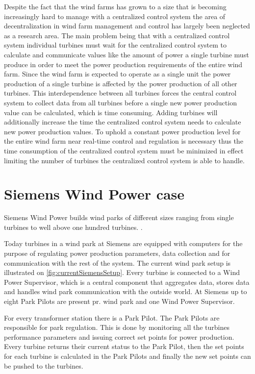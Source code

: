 Despite the fact that the wind farms has grown to a size that is becoming increasingly hard to manage with a centralized control system the area of decentralization in wind farm management and control has largely been neglected as a research area. The main problem being that with a centralized control system individual turbines must wait for the centralized control system to calculate and communicate values like the amount of power a single turbine must produce in order to meet the power production requirements of the entire wind farm. Since the wind farm is expected to operate as a single unit the power production of a single turbine is affected by the power production of all other turbines. This interdependence between all turbines forces the central control system to collect data from all turbines before a single new power production value can be calculated, which is time consuming. Adding turbines will additionally increase the time the centralized control system needs to calculate new power production values. To uphold a constant power production level for the entire wind farm near real-time control and regulation is necessary thus the time consumption of the centralized control system must be minimized in effect limiting the number of turbines the centralized control system is able to handle.

\section{Siemens Wind Power case}


\label{sec:SiemensCase}
Siemens Wind Power builds wind parks of different sizes ranging from single turbines to well above one hundred turbines. \cite{simensOffShoreProjects, simensOnShoreProjects}.

Today turbines in a wind park at Siemens are equipped with computers for the purpose of regulating power production parameters, data collection and for communication with the rest of the system. The current wind park setup is illustrated on \cref{fig:currentSiemensSetup}. Every turbine is connected to a Wind Power Supervisor, which is a central component that aggregates data, stores data and handles wind park communication with the outside world. At Siemens up to eight Park Pilots are present pr. wind park and one Wind Power Supervisor.

For every transformer station there is a Park Pilot. The Park Pilots are responsible for park regulation. This is done by monitoring all the turbines performance parameters and issuing correct set points for power production. Every turbine returns their current status to the Park Pilot, then the set points for each turbine is calculated in the Park Pilots and finally the new set points can be pushed to the turbines. 

